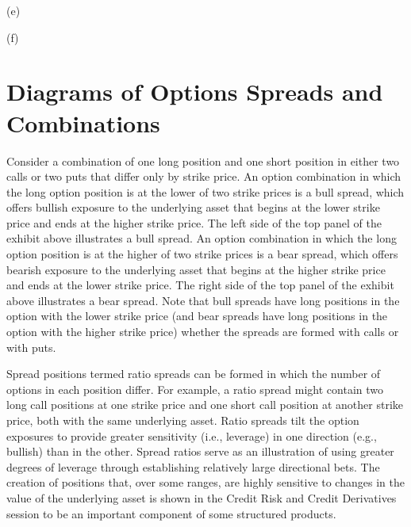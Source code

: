 \documentclass[11pt]{article}
\begin{document}
(e)

(f)

\section*{Diagrams of Options Spreads and Combinations}
Consider a combination of one long position and one short position in either two calls or two puts that differ only by strike price. An option combination in which the long option position is at the lower of two strike prices is a bull spread, which offers bullish exposure to the underlying asset that begins at the lower strike price and ends at the higher strike price. The left side of the top panel of the exhibit above illustrates a bull spread. An option combination in which the long option position is at the higher of two strike prices is a bear spread, which offers bearish exposure to the underlying asset that begins at the higher strike price and ends at the lower strike price. The right side of the top panel of the exhibit above illustrates a bear spread. Note that bull spreads have long positions in the option with the lower strike price (and bear spreads have long positions in the option with the higher strike price) whether the spreads are formed with calls or with puts.

Spread positions termed ratio spreads can be formed in which the number of options in each position differ. For example, a ratio spread might contain two long call positions at one strike price and one short call position at another strike price, both with the same underlying asset. Ratio spreads tilt the option exposures to provide greater sensitivity (i.e., leverage) in one direction (e.g., bullish) than in the other. Spread ratios serve as an illustration of using greater degrees of leverage through establishing relatively large directional bets. The creation of positions that, over some ranges, are highly sensitive to changes in the value of the underlying asset is shown in the Credit Risk and Credit Derivatives session to be an important component of some structured products.
\end{document}
